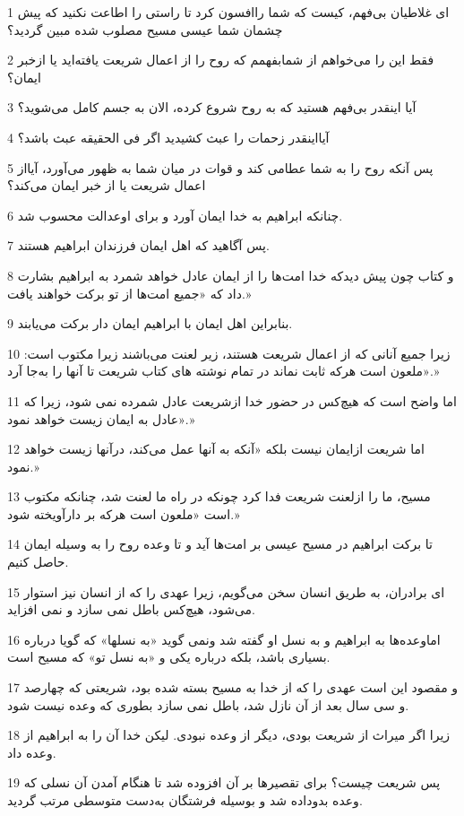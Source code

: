 \par 1 ای غلاطیان بی‌فهم، کیست که شما راافسون کرد تا راستی را اطاعت نکنید که پیش چشمان شما عیسی مسیح مصلوب شده مبین گردید؟
\par 2 فقط این را می‌خواهم از شمابفهمم که روح را از اعمال شریعت یافته‌اید یا ازخبر ایمان؟
\par 3 آیا اینقدر بی‌فهم هستید که به روح شروع کرده، الان به جسم کامل می‌شوید؟
\par 4 آیااینقدر زحمات را عبث کشیدید اگر فی الحقیقه عبث باشد؟
\par 5 پس آنکه روح را به شما عطامی کند و قوات در میان شما به ظهور می‌آورد، آیااز اعمال شریعت یا از خبر ایمان می‌کند؟
\par 6 چنانکه ابراهیم به خدا ایمان آورد و برای اوعدالت محسوب شد.
\par 7 پس آگاهید که اهل ایمان فرزندان ابراهیم هستند.
\par 8 و کتاب چون پیش دیدکه خدا امت‌ها را از ایمان عادل خواهد شمرد به ابراهیم بشارت داد که «جمیع امت‌ها از تو برکت خواهند یافت.»
\par 9 بنابراین اهل ایمان با ابراهیم ایمان دار برکت می‌یابند.
\par 10 زیرا جمیع آنانی که از اعمال شریعت هستند، زیر لعنت می‌باشند زیرا مکتوب است: «ملعون است هر‌که ثابت نماند در تمام نوشته های کتاب شریعت تا آنها را به‌جا آرد.»
\par 11 اما واضح است که هیچ‌کس در حضور خدا ازشریعت عادل شمرده نمی شود، زیرا که «عادل به ایمان زیست خواهد نمود.»
\par 12 اما شریعت ازایمان نیست بلکه «آنکه به آنها عمل می‌کند، درآنها زیست خواهد نمود.»
\par 13 مسیح، ما را ازلعنت شریعت فدا کرد چونکه در راه ما لعنت شد، چنانکه مکتوب است «ملعون است هرکه بر دارآویخته شود.»
\par 14 تا برکت ابراهیم در مسیح عیسی بر امت‌ها آید و تا وعده روح را به وسیله ایمان حاصل کنیم.
\par 15 ‌ای برادران، به طریق انسان سخن می‌گویم، زیرا عهدی را که از انسان نیز استوار می‌شود، هیچ‌کس باطل نمی سازد و نمی افزاید.
\par 16 اماوعده‌ها به ابراهیم و به نسل او گفته شد ونمی گوید «به نسلها» که گویا درباره بسیاری باشد، بلکه درباره یکی و «به نسل تو» که مسیح است.
\par 17 و مقصود این است عهدی را که از خدا به مسیح بسته شده بود، شریعتی که چهارصد و سی سال بعد از آن نازل شد، باطل نمی سازد بطوری که وعده نیست شود.
\par 18 زیرا اگر میراث از شریعت بودی، دیگر از وعده نبودی. لیکن خدا آن را به ابراهیم از وعده داد.
\par 19 پس شریعت چیست؟ برای تقصیرها بر آن افزوده شد تا هنگام آمدن آن نسلی که وعده بدوداده شد و بوسیله فرشتگان به‌دست متوسطی مرتب گردید.

